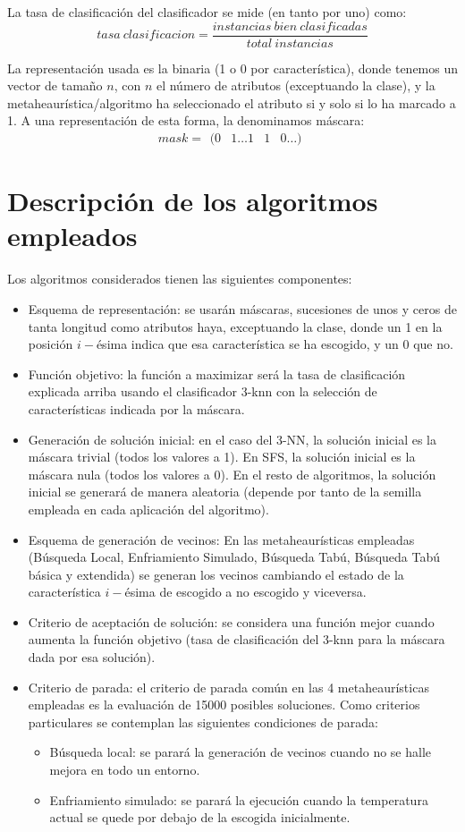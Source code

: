 \documentclass[a4paper,11pt]{article}
\begin{document}
La tasa de clasificación del clasificador se mide (en tanto por uno) como: $$tasa\: clasificacion = \frac{instancias\: 
bien\: clasificadas}{total\: instancias}$$

La representación usada es la binaria (1 o 0 por característica), donde tenemos un vector de tamaño $n$, con $n$ el número 
de atributos (exceptuando la clase), y la metaheaurística/algoritmo ha seleccionado el atributo si y solo si lo ha marcado 
a 1. A una representación de esta forma, la denominamos máscara: $$ mask =\begin{matrix} (0 & 1\ldots 1 & 1 & 0\ldots) 
\end{matrix}$$


\section{Descripción de los algoritmos empleados}
Los algoritmos considerados tienen las siguientes componentes:

\begin{itemize} 
\item Esquema de representación: se usarán máscaras, sucesiones de unos y ceros de tanta longitud como atributos haya,
exceptuando la clase, donde un 1 en la posición $i-$ésima indica que esa característica se ha escogido, y un $0$ que no.
\item Función objetivo: la función a maximizar será la tasa de clasificación explicada arriba usando el clasificador
3-knn con la selección de características indicada por la máscara.

\small\texttt{}

\item Generación de solución inicial: en el caso del 3-NN, la solución inicial es la máscara trivial (todos los valores a 1).
En SFS, la solución inicial es la máscara nula (todos los valores a 0). En el resto de algoritmos, la solución inicial se
generará de manera aleatoria (depende por tanto de la semilla empleada en cada aplicación del algoritmo).
\item Esquema de generación de vecinos: En las metaheaurísticas empleadas (Búsqueda Local, Enfriamiento Simulado, Búsqueda
Tabú, Búsqueda Tabú básica y extendida) se generan los vecinos cambiando el estado de la característica $i-$ésima de
escogido a no escogido y viceversa.
\item Criterio de aceptación de solución: se considera una función mejor cuando aumenta la función objetivo (tasa de clasificación del 3-knn para la máscara
dada por esa solución).
\item Criterio de parada: el criterio de parada común en las 4 metaheaurísticas empleadas es la evaluación de 15000 posibles
soluciones. Como criterios particulares se contemplan las siguientes condiciones de parada:
  \begin{itemize}
    \item Búsqueda local: se parará la generación de vecinos cuando no se halle mejora en todo un entorno.
    \item Enfriamiento simulado: se parará la ejecución cuando la temperatura actual se quede por debajo de la escogida
    inicialmente.
  \end{itemize}
\end{itemize}
\end{document}

